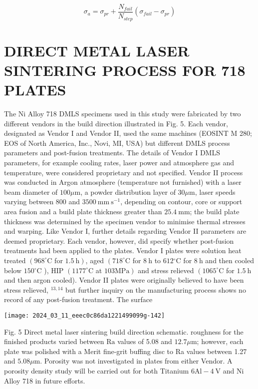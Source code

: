 \documentclass[10pt]{article}
\begin{document}
\begin{equation*}
\sigma_{a}=\sigma_{p r}+\frac{N_{f a i l}}{N_{s t e p}}\left(\sigma_{f a i l}-\sigma_{p r}\right) \tag{1}
\end{equation*}


\section*{DIRECT METAL LASER SINTERING PROCESS FOR 718 PLATES}
The Ni Alloy 718 DMLS specimens used in this study were fabricated by two different vendors in the build direction illustrated in Fig. 5. Each vendor, designated as Vendor I and Vendor II, used the same machines (EOSINT M 280; EOS of North America, Inc., Novi, MI, USA) but different DMLS process parameters and post-fusion treatments. The details of Vendor I DMLS parameters, for example cooling rates, laser power and atmosphere gas and temperature, were considered proprietary and not specified. Vendor II process was conducted in Argon atmosphere (temperature not furnished) with a laser beam diameter of $100 \mu \mathrm{m}$, a powder distribution layer of $30 \mu \mathrm{m}$, laser speeds varying between 800 and $3500 \mathrm{~mm} \mathrm{~s}^{-1}$, depending on contour, core or support area fusion and a build plate thickness greater than $25.4 \mathrm{~mm}$; the build plate thickness was determined by the specimen vendor to minimise thermal stresses and warping. Like Vendor I, further details regarding Vendor II parameters are deemed proprietary. Each vendor, however, did specify whether post-fusion treatments had been applied to the plates. Vendor I plates were solution heat treated $\left(968^{\circ} \mathrm{C}\right.$ for $\left.1.5 \mathrm{~h}\right)$, aged $\left(718^{\circ} \mathrm{C}\right.$ for $8 \mathrm{~h}$ to $612{ }^{\circ} \mathrm{C}$ for $8 \mathrm{~h}$ and then cooled below $150{ }^{\circ} \mathrm{C}$ ), HIP $\left(1177^{\circ} \mathrm{C}\right.$ at $\left.103 \mathrm{MPa}\right)$ and stress relieved $\left(1065^{\circ} \mathrm{C}\right.$ for $1.5 \mathrm{~h}$ and then argon cooled). Vendor II plates were originally believed to have been stress relieved, ${ }^{13,14}$ but further inquiry on the manufacturing process shows no record of any post-fusion treatment. The surface

\begin{center}
\texttt{[image: 2024\_03\_11\_eeec0c86da1221499099g-142]}
\end{center}

Fig. 5 Direct metal laser sintering build direction schematic. roughness for the finished products varied between $\mathrm{Ra}$ values of 5.08 and $12.7 \mu \mathrm{m}$; however, each plate was polished with a Merit fine-grit buffing disc to Ra values between 1.27 and $5.08 \mu \mathrm{m}$. Porosity was not investigated in plates from either Vendor. A porosity density study will be carried out for both Titanium $6 \mathrm{Al}-4 \mathrm{~V}$ and $\mathrm{Ni}$ Alloy 718 in future efforts.
\end{document}
